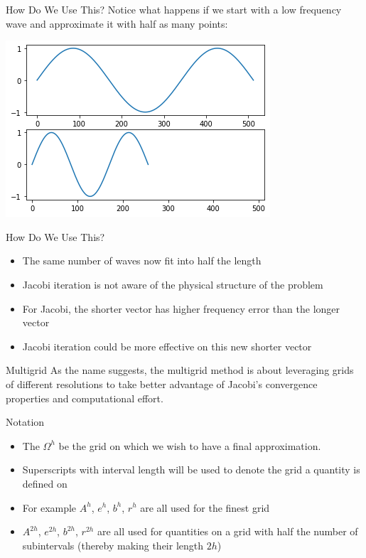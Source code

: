 \documentclass[11pt]{beamer}
\begin{document}
\begin{frame}{How Do We Use This?}
  Notice what happens if we start with a low frequency wave and approximate it
  with half as many points:
  \begin{center}
    \includegraphics[width=\linewidth]{output_18_0.png}
  \end{center}
\end{frame}
\begin{frame}{How Do We Use This?}
  \begin{itemize}
  \item The same number of waves now fit into half the length
  \item Jacobi iteration is not aware of the physical structure of the
    problem
  \item For Jacobi, the shorter vector has higher frequency error than the
    longer vector
  \item Jacobi iteration could be more effective on this new shorter vector
  \end{itemize}
\end{frame}
\begin{frame}{Multigrid}
  As the name suggests, the multigrid method is about leveraging grids of
  different resolutions to take better advantage of Jacobi's convergence
  properties and computational effort.
\end{frame}
\begin{frame}{Notation}
  \begin{itemize}
  \item The $\Omega^h$ be the grid on which we wish to have a final approximation.
  \item Superscripts with interval length will be used to denote the grid a
    quantity is defined on
  \item For example $A^h$, $e^h$, $b^{h}$, $r^h$ are all used for the finest grid
  \item $A^{2h}$, $e^{2h}$, $b^{2h}$, $r^{2h}$ are all used for quantities on a grid
    with half the number of subintervals (thereby making their length $2h$)
  \end{itemize}
\end{frame}
\end{document}
